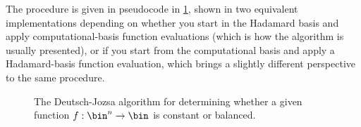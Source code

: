       The procedure is given in pseudocode in \cref{fig:DeutschJozsa}, shown in two
        equivalent implementations depending on whether you start in the
        Hadamard basis and apply computational-basis function evaluations (which
        is how the algorithm is usually presented), or if you start from the
        computational basis and apply a Hadamard-basis function evaluation,
        which brings a slightly different perspective to the same procedure.

      \begin{figure}[h!]
   	    \begin{center}
        \end{center}
        \caption{
          \label{fig:DeutschJozsa}
          The Deutsch-Jozsa algorithm for determining whether a given function
          $f: \bin^n \to \bin$ is constant or balanced.
        }
      \end{figure}

